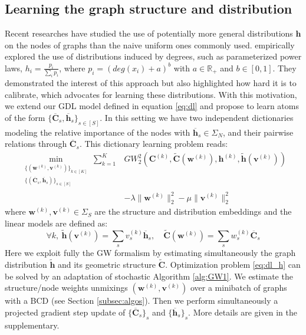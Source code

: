\documentclass{article}
\def\vh{{\bm{h}}}
\def\vv{{\bm{v}}}
\def\vw{{\bm{w}}}
\def\mC{{\bm{C}}}
\newcommand{\R}{\mathbb{R}}
\def\R{{\mathbb{R}}}
\begin{document}
	\subsection{Learning the graph structure and distribution}
	\label{subsec:GW_subgrad}
	
	Recent researches have studied the use of potentially more general distributions
	$\vh$
	on the nodes of graphs than the naive uniform ones commonly used. \citep{xu2019scalable} empirically explored the use of distributions induced by
	degrees, such as parameterized power
	laws, $h_i = \frac{p_i}{\sum_i p_i}$, where $p_i = (deg(x_i)+a)^b$ with $a \in
	\R_+$ and $b \in [0,1]$. They demonstrated the interest of this approach but also highlighted how hard it is to calibrate, which {advocates for learning these distributions.}
	With this motivation, we extend our GDL model defined in
	equation \ref{eq:dl} and propose to learn atoms of the form $\{\overline{\mC}_s,\overline{\vh}_s\}_{s\in [S]}$. In this setting we have
	two independent dictionaries modeling the relative importance of the nodes with
	$\overline{\vh}_s \in \Sigma_N$, and their pairwise relations through $\overline{\mC}_s$. This
	dictionary learning problem reads:
	\begin{align}
	\min_{\substack{\{(\vw^{(k)},\vv^{(k)})\}_{k \in [K]}\\
			\{(\overline{\mC}_s,\overline{\vh}_s)\}_{s\in [S]}}} \sum_{k=1}^K & GW^2_2\left(\mC^{(k)},\widetilde{\mC}(\vw^{(k)}), \vh^{(k)}, \widetilde{\vh}(\vv^{(k)})\right) \nonumber\\
	& - \lambda \|\vw^{(k)}\|^2_2 - \mu \|\vv^{(k)}\|^2_2\label{eq:dl_h}
	\end{align}
	where $\vw^{(k)},\vv^{(k)} \in \Sigma_S$ are the structure and distribution embeddings and the linear models are defined as:
	\begin{equation*}
	\forall k,\
	\widetilde{\vh}(\vv^{(k)}) = \sum_s v^{(k)}_s\overline{\vh}_s,\quad  
	\widetilde{\mC}(\vw^{(k)}) = \sum_s w^{(k)}_s \overline{\mC}_s 
	\end{equation*}
	Here we exploit fully the GW
	formalism by estimating simultaneously the graph distribution $\widetilde{\vh}$
	and its geometric structure $\widetilde{\mC}$. Optimization problem \ref{eq:dl_h} can
	be solved by an adaptation of stochastic Algorithm \ref{alg:GW1}. We estimate
	the structure/node weights unmixings
	$(\vw^{(k)},\vv^{(k)})$ over a minibatch of graphs with a BCD (see Section
	\ref{subsec:algos}). Then we perform simultaneously a projected gradient step
	update of $\{\overline{\mC}_s\}_s$ and $\{\overline{\vh}_s\}_s$. More details are given in the supplementary.
\end{document}
